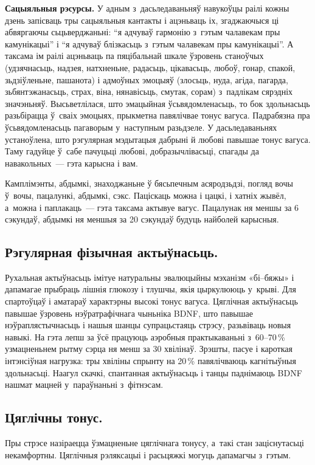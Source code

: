 \textbf{Сацыяльныя рэсурсы.} У адным з~дасьледаваньняў навукоўцы раілі кожны дзень запісваць тры сацыяльныя кантакты і ацэньваць іх, згаджаючыся ці абвяргаючы сьцьверджаньні: ``я адчуваў гармонію з~гэтым чалавекам пры камунікацыі'' і ``я адчуваў блізкасьць з~гэтым чалавекам пры камунікацыі''. А таксама ім раілі ацэньваць па пяцібальнай шкале ўзровень станоўчых (удзячнасьць, надзея, натхненьне, радасьць, цікавасьць, любоў, гонар, спакой, зьдзіўленьне, пашанота) і адмоўных эмоцыяў (злосьць, нуда, агіда, пагарда, зьбянтэжанасьць, страх, віна, нянавісьць, смутак, сорам) з~падлікам сярэдніх значэньняў. Высьветлілася, што эмацыйная ўсьвядомленасьць, то бок здольнасьць разьбірацца ў~сваіх эмоцыях, прыкметна павялічвае тонус вагуса. Падрабязна пра ўсьвядомленасьць пагаворым у~наступным разьдзеле. У дасьледаваньнях устаноўлена, што рэгулярная мэдытацыя дабрыні й любові павышае тонус вагуса. Таму гадуйце ў~сабе пачуцьці любові, добразычлівасьці, спагады да навакольных~--- гэта карысна і вам.

Камплімэнты, абдымкі, знаходжаньне ў бясьпечным асяродзьдзі, погляд вочы ў~вочы, пацалункі, абдымкі, сэкс. Паціскаць можна і цацкі, і хатніх жывёл, а~можна і паплакаць~--- гэта таксама актывуе вагус. Пацалунак ня меншы за 6 сэкундаў, абдымкі ня меншыя за 20 сэкундаў будуць найболей карысныя.

\subsection*{Рэгулярная фізычная актыўнасьць.}

Рухальная актыўнасьць імітуе натуральны эвалюцыйны мэханізм «бі--бяжы» і дапамагае прыбраць лішнія глюкозу і тлушчы, якія цыркулююць у~крыві. Для спартоўцаў і аматараў характэрны высокі тонус вагуса. Цяглічная актыўнасьць павышае ўзровень нэўратрафічнага чыньніка BDNF, што павышае нэўраплястычнасьць і нашыя шанцы супрацьстаяць стрэсу, разьвіваць новыя навыкі. На гэта лепш за ўсё працуюць аэробныя практыкаваньні з~60--70\,\% узмацненьнем рытму сэрца ня менш за 30 хвілінаў. Зрэшты, пасуе і кароткая інтэнсіўная нагрузка: тры хвіліны спрынту на 20\,\% павялічваюць кагнітыўныя здольнасьці. Наагул скачкі, спантанная актыўнасьць і танцы паднімаюць BDNF нашмат мацней у~параўнаньні з~фітнэсам.

\subsection*{Цяглічны тонус.}

Пры стрэсе назіраецца ўзмацненьне цяглічнага тонусу, а~такі стан заціснутасьці некамфортны. Цяглічныя рэляксацыі і расьцяжкі могуць дапамагчы з~гэтым. 

